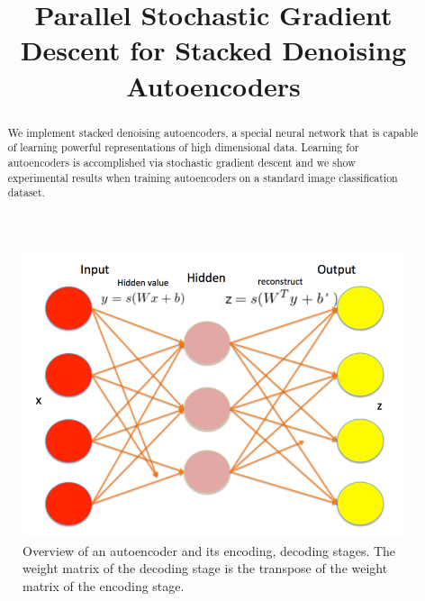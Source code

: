 \documentclass[conference]{IEEEtran}
\begin{document}
\title{Parallel Stochastic Gradient Descent for Stacked Denoising Autoencoders}

\author{
\and
{}
}

\maketitle

\begin{abstract}
We implement stacked denoising autoencoders, a special neural network that is capable of learning powerful representations of high dimensional data. Learning for autoencoders is accomplished via stochastic gradient descent and we show experimental results when training autoencoders on a standard image classification dataset. 
\end{abstract}

\begin{figure}[h]
\centering
\includegraphics[width=1.0\linewidth]{autoencoder.png}
\caption{Overview of an autoencoder and its encoding, decoding stages. The weight matrix of the decoding stage is the transpose of the weight matrix of the encoding stage.}
\label{fig:autoencoder}
\end{figure}
\end{document}
